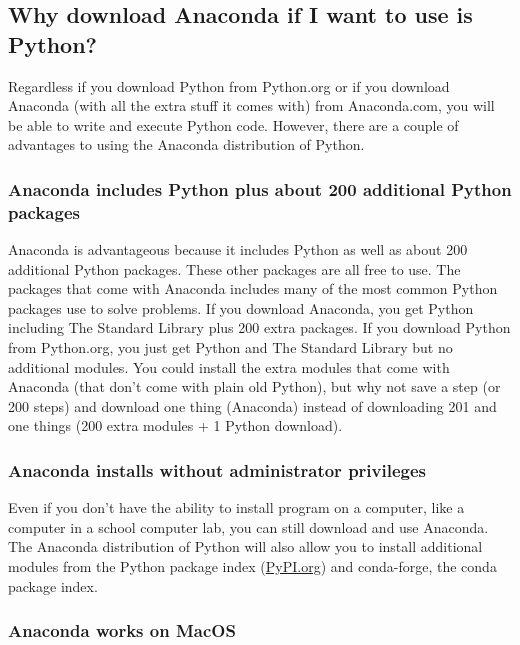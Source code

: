 \documentclass{book}
\begin{document}
    \subsection{Why download Anaconda if I want to use is
Python?}\label{why-download-anaconda-if-i-want-to-use-is-python}

Regardless if you download Python from Python.org or if you download
Anaconda (with all the extra stuff it comes with) from Anaconda.com, you
will be able to write and execute Python code. However, there are a
couple of advantages to using the Anaconda distribution of Python.

\subsubsection{Anaconda includes Python plus about 200 additional Python
packages}\label{anaconda-includes-python-plus-about-200-additional-python-packages}

Anaconda is advantageous because it includes Python as well as about 200
additional Python packages. These other packages are all free to use.
The packages that come with Anaconda includes many of the most common
Python packages use to solve problems. If you download Anaconda, you get
Python including The Standard Library plus 200 extra packages. If you
download Python from Python.org, you just get Python and The Standard
Library but no additional modules. You could install the extra modules
that come with Anaconda (that don't come with plain old Python), but why
not save a step (or 200 steps) and download one thing (Anaconda) instead
of downloading 201 and one things (200 extra modules + 1 Python
download).

\subsubsection{Anaconda installs without administrator
privileges}\label{anaconda-installs-without-administrator-privileges}

Even if you don't have the ability to install program on a computer,
like a computer in a school computer lab, you can still download and use
Anaconda. The Anaconda distribution of Python will also allow you to
install additional modules from the Python package index
(\href{https://pypi.org/}{PyPI.org}) and conda-forge, the conda package
index.

\subsubsection{Anaconda works on MacOS}\label{anaconda-works-on-macos}
\end{document}
